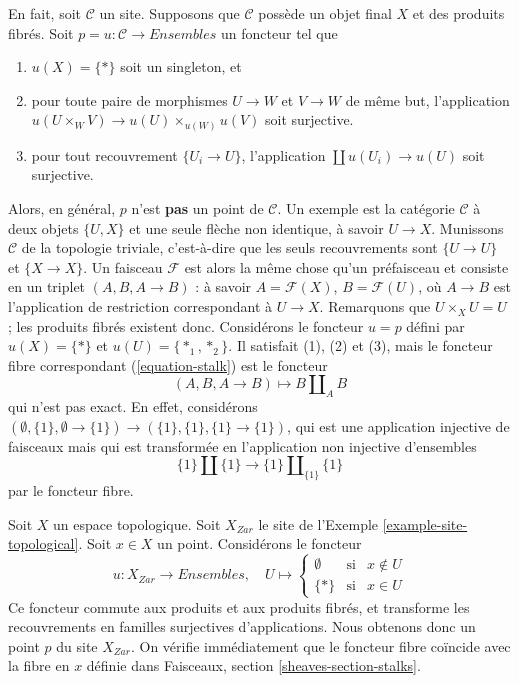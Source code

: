 \begin{remark}
\label{remark-improve-proposition-points-limits}
En fait, soit $\mathcal{C}$ un site. Supposons que $\mathcal{C}$ possède un objet final
$X$ et des produits fibrés. Soit $p = u: \mathcal{C} \to \textit{Ensembles}$ un
foncteur tel que
\begin{enumerate}
\item $u(X) = \{*\}$ soit un singleton, et
\item pour toute paire de morphismes $U \to W$ et $V \to W$ de
même but, l’application
$u(U \times_W V) \to u(U) \times_{u(W)} u(V)$ soit surjective.
\item pour tout recouvrement $\{U_i \to U\}$, l’application
$\coprod u(U_i) \to u(U)$ soit surjective.
\end{enumerate}
Alors, en général, $p$ n’est {\bf pas} un point de $\mathcal{C}$.
Un exemple est la catégorie $\mathcal{C}$ à deux objets $\{U, X\}$
et une seule flèche non identique, à savoir $U \to X$. Munissons $\mathcal{C}$
de la topologie triviale, c’est-à-dire que les seuls recouvrements sont $\{U \to U\}$ et
$\{X \to X\}$. Un faisceau $\mathcal{F}$ est alors la même chose qu’un préfaisceau et
consiste en un triplet $(A, B, A \to B)$ : à savoir $A = \mathcal{F}(X)$,
$B = \mathcal{F}(U)$, où $A \to B$ est l’application de restriction correspondant
à $U \to X$. Remarquons que $U \times_X U = U$ ; les produits fibrés existent donc.
Considérons le foncteur $u = p$ défini par $u(X) = \{*\}$ et $u(U) = \{*_1, *_2\}$.
Il satisfait (1), (2) et (3), mais le foncteur fibre correspondant
(\ref{equation-stalk}) est le foncteur
$$
(A, B, A \to B) \longmapsto B \amalg_A B
$$
qui n’est pas exact. En effet, considérons
$(\emptyset, \{1\}, \emptyset \to \{1\}) \to (\{1\}, \{1\}, \{1\} \to \{1\})$,
qui est une application injective de faisceaux mais qui est transformée en l’application
non injective d’ensembles
$$
\{1\} \amalg \{1\} \longrightarrow \{1\} \amalg_{\{1\}} \{1\}
$$
par le foncteur fibre.
\end{remark}

\begin{example}
\label{example-point-topological}
Soit $X$ un espace topologique. Soit $X_{Zar}$ le site de
l’Exemple \ref{example-site-topological}.
Soit $x \in X$ un point. Considérons le foncteur
$$
u : X_{Zar} \longrightarrow \textit{Ensembles}, \quad
U \mapsto
\left\{
\begin{matrix}
\emptyset & \text{si} & x \not \in U \\
\{*\} & \text{si} & x \in U
\end{matrix}
\right.
$$
Ce foncteur commute aux produits et aux produits fibrés,
et transforme les recouvrements en familles surjectives d’applications.
Nous obtenons donc un point $p$ du site $X_{Zar}$.
On vérifie immédiatement que le foncteur fibre
coïncide avec la fibre en $x$ définie dans
Faisceaux, section
\ref{sheaves-section-stalks}.
\end{example}

